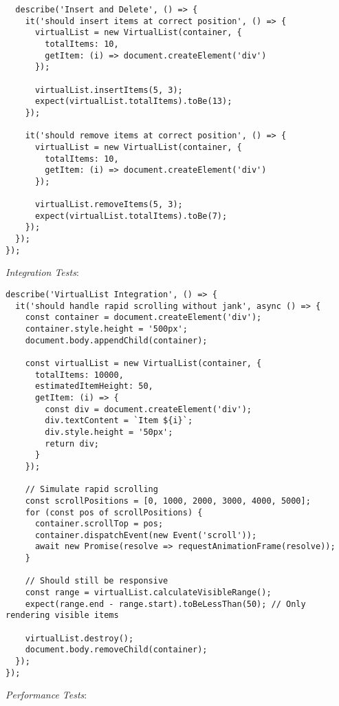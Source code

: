 \documentclass[11pt]{article}
\begin{document}
\begin{verbatim}
  describe('Insert and Delete', () => {
    it('should insert items at correct position', () => {
      virtualList = new VirtualList(container, {
        totalItems: 10,
        getItem: (i) => document.createElement('div')
      });
      
      virtualList.insertItems(5, 3);
      expect(virtualList.totalItems).toBe(13);
    });
    
    it('should remove items at correct position', () => {
      virtualList = new VirtualList(container, {
        totalItems: 10,
        getItem: (i) => document.createElement('div')
      });
      
      virtualList.removeItems(5, 3);
      expect(virtualList.totalItems).toBe(7);
    });
  });
});
\end{verbatim}

\emph{Integration Tests}:

\begin{verbatim}
describe('VirtualList Integration', () => {
  it('should handle rapid scrolling without jank', async () => {
    const container = document.createElement('div');
    container.style.height = '500px';
    document.body.appendChild(container);
    
    const virtualList = new VirtualList(container, {
      totalItems: 10000,
      estimatedItemHeight: 50,
      getItem: (i) => {
        const div = document.createElement('div');
        div.textContent = `Item ${i}`;
        div.style.height = '50px';
        return div;
      }
    });
    
    // Simulate rapid scrolling
    const scrollPositions = [0, 1000, 2000, 3000, 4000, 5000];
    for (const pos of scrollPositions) {
      container.scrollTop = pos;
      container.dispatchEvent(new Event('scroll'));
      await new Promise(resolve => requestAnimationFrame(resolve));
    }
    
    // Should still be responsive
    const range = virtualList.calculateVisibleRange();
    expect(range.end - range.start).toBeLessThan(50); // Only rendering visible items
    
    virtualList.destroy();
    document.body.removeChild(container);
  });
});
\end{verbatim}

\emph{Performance Tests}:
\end{document}
